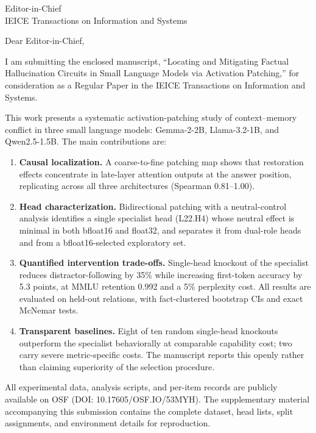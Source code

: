 \documentclass[11pt]{letter}
\begin{document}
\begin{letter}{%
Editor-in-Chief\\
IEICE Transactions on Information and Systems
}

\opening{Dear Editor-in-Chief,}

I am submitting the enclosed manuscript, ``Locating and Mitigating
Factual Hallucination Circuits in Small Language Models via Activation
Patching,'' for consideration as a Regular Paper in the IEICE
Transactions on Information and Systems.

This work presents a systematic activation-patching study of
context--memory conflict in three small language models: Gemma-2-2B,
Llama-3.2-1B, and Qwen2.5-1.5B. The main contributions are:

\begin{enumerate}
\item \textbf{Causal localization.} A coarse-to-fine patching map
shows that restoration effects concentrate in late-layer attention
outputs at the answer position, replicating across all three
architectures (Spearman 0.81--1.00).

\item \textbf{Head characterization.} Bidirectional patching with a
neutral-control analysis identifies a single specialist head
(L22.H4) whose neutral effect is minimal in both bfloat16 and
float32, and separates it from dual-role heads and from a
bfloat16-selected exploratory set.

\item \textbf{Quantified intervention trade-offs.} Single-head
knockout of the specialist reduces distractor-following by 35\%
while increasing first-token accuracy by 5.3 points, at MMLU
retention 0.992 and a 5\% perplexity cost. All results are
evaluated on held-out relations, with fact-clustered bootstrap CIs
and exact McNemar tests.

\item \textbf{Transparent baselines.} Eight of ten random
single-head knockouts outperform the specialist behaviorally at
comparable capability cost; two carry severe metric-specific costs.
The manuscript reports this openly rather than claiming superiority
of the selection procedure.
\end{enumerate}

All experimental data, analysis scripts, and per-item records are
publicly available on OSF (DOI: 10.17605/OSF.IO/53MYH). The
supplementary material accompanying this submission contains the
complete dataset, head lists, split assignments, and environment
details for reproduction.


\end{letter}
\end{document}

